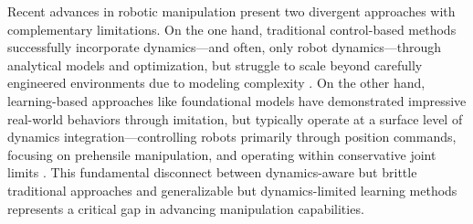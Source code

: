 

Recent advances in robotic manipulation present two divergent approaches with complementary limitations.
On the one hand, traditional control-based methods successfully incorporate dynamics---and often, only robot dynamics---through analytical models and optimization, but struggle to scale beyond carefully engineered environments due to modeling complexity \cite{feng2014optimization,gamba2023springy}. On the other hand, learning-based approaches like foundational models have demonstrated impressive real-world behaviors through imitation, but typically operate at a surface level of dynamics integration---controlling robots primarily through position commands, focusing on prehensile manipulation, and operating within conservative joint limits \cite{chi2023diffusion,team2024octo}. This fundamental disconnect between dynamics-aware but brittle traditional approaches and generalizable but dynamics-limited learning methods represents a critical gap in advancing manipulation capabilities.


